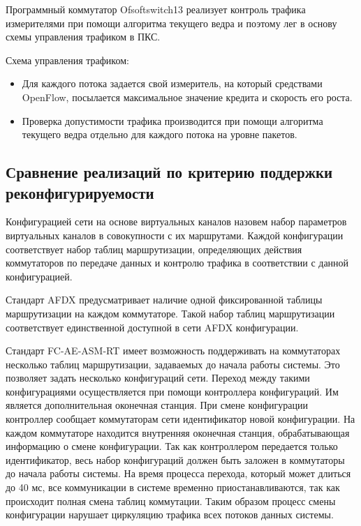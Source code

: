 \documentclass[12pt, a4paper]{article}
\begin{document}
Программный коммутатор Ofsoftswitch13 \cite{ofsoftswitch} реализует контроль трафика измерителями при помощи алгоритма текущего ведра и поэтому лег в основу схемы управления трафиком в ПКС.

Схема управления трафиком:
\begin{itemize}
	\item Для каждого потока задается свой измеритель, на который средствами OpenFlow, посылается максимальное значение кредита и скорость его роста.
	\item Проверка допустимости трафика производится при помощи алгоритма текущего ведра отдельно для каждого потока на уровне пакетов.
\end{itemize}

\subsection{Сравнение реализаций по критерию поддержки реконфигурируемости}
Конфигурацией сети на основе виртуальных каналов назовем набор параметров виртуальных каналов в совокупности с их маршрутами. Каждой конфигурации соответствует набор таблиц маршрутизации, определяющих действия коммутаторов по передаче данных и контролю трафика в соответствии с данной конфигурацией.

Стандарт AFDX предусматривает наличие одной фиксированной таблицы маршрутизации на каждом коммутаторе. Такой набор таблиц маршрутизации соответствует единственной доступной в сети AFDX конфигурации.

Стандарт FC-AE-ASM-RT имеет возможность поддерживать на коммутаторах несколько таблиц маршрутизации, задаваемых до начала работы системы. Это позволяет задать несколько конфигураций сети. Переход между такими конфигурациями осуществляется при помощи контроллера конфигураций. Им является дополнительная оконечная станция. При смене конфигурации контроллер сообщает коммутаторам сети идентификатор новой конфигурации. На каждом коммутаторе находится внутренняя оконечная станция, обрабатывающая информацию о смене конфигурации. Так как контроллером передается только идентификатор, весь набор конфигураций должен быть заложен в коммутаторы до начала работы системы. На время процесса перехода, который может длиться до 40 мс, все коммуникации в системе временно приостанавливаются, так как происходит полная смена таблиц коммутации. Таким образом процесс смены конфигурации нарушает циркуляцию трафика всех потоков данных системы.
\end{document}
